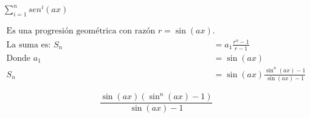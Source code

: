 $\displaystyle \sum_{i=1}^{n} sen^i(ax)$

\nopagebreak
\begin{align*}
\text{Es una progresión geométrica con razón } r = \sin(ax). \\
\text{La suma es: } S_n &= a_1 \frac{r^n - 1}{r - 1} \\
\text{Donde } a_1 &= \sin(ax) \\
S_n &= \sin(ax) \frac{\sin^n(ax) - 1}{\sin(ax) - 1}
\end{align*}

\[
\boxed{\displaystyle \frac{\sin(ax) (\sin^n(ax) - 1)}{\sin(ax) - 1}}
\]
